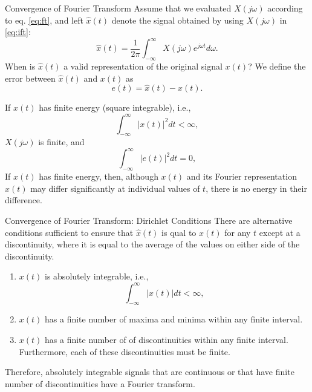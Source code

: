 \begin{frame}[plain]{Convergence of Fourier Transform}
    Assume that we evaluated $X(j\omega)$ according to eq. \ref{eq:ft}, and left $\hat{x}(t)$ denote the signal obtained by using $X(j\omega)$ in \ref{eq:ift}:
    \begin{equation*}
        \hat{x}(t) = \frac{1}{2\pi}\int_{-\infty}^{\infty}X(j\omega)e^{j\omega t} d\omega.
    \end{equation*}
    When is $\hat{x}(t)$  a valid representation of the original signal $x(t)$? We define the error between $\hat{x}(t)$ and $x(t)$ as
    \begin{equation*}
        e(t) = \hat{x}(t) - x(t).
    \end{equation*}

    If $x(t)$ has finite energy (square integrable), i.e.,
    \begin{equation}
        \int_{-\infty}^{\infty}|x(t)|^2dt < \infty,
    \end{equation}
    $X(j\omega)$ is finite, and
    \begin{equation}
        \int_{-\infty}^{\infty}|e(t)|^2dt = 0,
    \end{equation}
    If $x(t)$ has finite energy, then, although $x(t)$ and its Fourier representation  $\hat{x}(t)$ may differ significantly at individual values of $t$, there is no  energy in their difference.
\end{frame}

\begin{frame}[plain]{Convergence of Fourier Transform: Dirichlet Conditions}
    There are alternative conditions sufficient to ensure that  $\hat{x}(t)$ is qual to $x(t)$ for any $t$ except at a discontinuity, where it is equal to the average of the values on either side of the discontinuity.
    \begin{enumerate}
        \item $x(t)$ is absolutely integrable, i.e.,
            \begin{equation}
                \int_{-\infty}^{\infty}|x(t)|dt < \infty,
            \end{equation}
        \item $x(t)$ has a finite number of maxima and minima within any finite interval.
        \item $x(t)$ has a finite number of of discontinuities within any finite interval. Furthermore, each of these discontinuities must be finite.
    \end{enumerate}
    Therefore, absolutely integrable signals that are continuous or that have finite number of discontinuities have a Fourier transform.
\end{frame}

